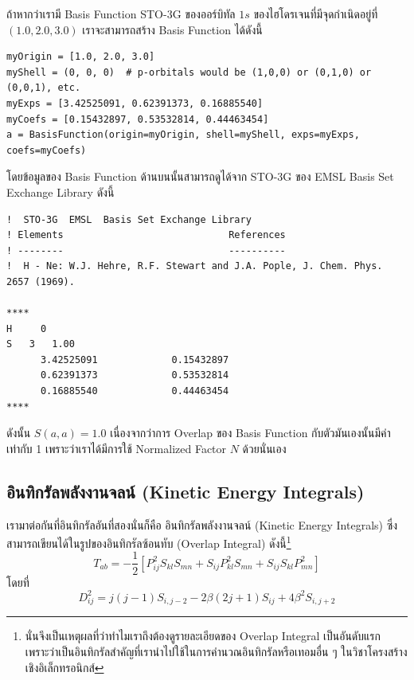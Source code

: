 ถ้าหากว่าเรามี Basis Function STO-3G ของออร์บิทัล $1s$ ของไฮโดรเจนที่มีจุดกำเนิดอยู่ที่ $(1.0, 2.0, 3.0)$ เราจะสามารถสร้าง Basis Function ได้ดังนี้

\vspace{5pt}

\begin{lstlisting}[style=MyPython]
myOrigin = [1.0, 2.0, 3.0]
myShell = (0, 0, 0)  # p-orbitals would be (1,0,0) or (0,1,0) or (0,0,1), etc.
myExps = [3.42525091, 0.62391373, 0.16885540]
myCoefs = [0.15432897, 0.53532814, 0.44463454]
a = BasisFunction(origin=myOrigin, shell=myShell, exps=myExps, coefs=myCoefs)
\end{lstlisting}

\vspace{5pt}

\noindent โดยข้อมูลของ Basis Function ด้านบนนั้นสามารถดูได้จาก STO-3G ของ EMSL Basis Set Exchange Library ดังนี้

\vspace{5pt}

\begin{lstlisting}
!  STO-3G  EMSL  Basis Set Exchange Library 
! Elements                             References
! --------                             ----------
!  H - Ne: W.J. Hehre, R.F. Stewart and J.A. Pople, J. Chem. Phys. 2657 (1969).

****
H     0 
S   3   1.00
      3.42525091             0.15432897       
      0.62391373             0.53532814       
      0.16885540             0.44463454       
****
\end{lstlisting}

\vspace{5pt}

ดังนั้น $S(a,a) = 1.0$ เนื่องจากว่าการ Overlap ของ Basis Function กับตัวมันเองนั้นมีค่าเท่ากับ 1 เพราะว่าเราได้มีการใช้ Normalized Factor $N$ ด้วยนั่นเอง

\subsection{อินทิกรัลพลังงานจลน์ (Kinetic Energy Integrals)}

เรามาต่อกันที่อินทิกรัลอันที่สองนั่นก็คือ อินทิกรัลพลังงานจลน์ (Kinetic Energy Integrals) ซึ่งสามารถเขียนได้ในรูปของอินทิกรัลซ้อนทับ (Overlap Integral) ดังนี้\footnote{นั่นจึงเป็นเหตุผลที่ว่าทำไมเราถึงต้องดูรายละเอียดของ Overlap Integral เป็นอันดับแรก เพราะว่าเป็นอินทิกรัลสำคัญที่เรานำไปใช้ในการคำนวณอินทิกรัลหรือเทอมอื่น ๆ ในวิชาโครงสร้างเชิงอิเล็กทรอนิกส์}
%
\begin{equation}
  T_{ab}
  =
  -\frac{1}{2}\left[P_{ij}^2 S_{kl} S_{mn} + S_{ij}P_{kl}^2 S_{mn} + S_{ij} S_{kl} P_{mn}^2\right]
\end{equation}
%
โดยที่
%
\begin{equation}
  D_{ij}^2
  =
  j(j-1)S_{i,j-2} - 2\beta(2j +1)S_{ij} + 4\beta^2 S_{i,j+2}
\end{equation}


